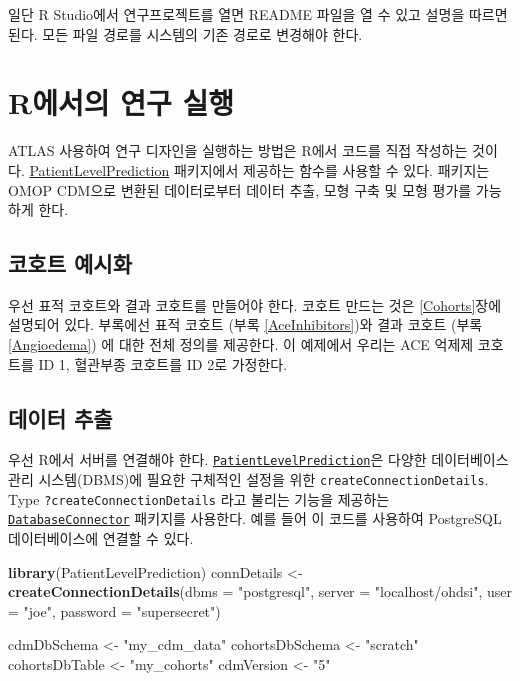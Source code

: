 \documentclass[11pt]{book}
\newenvironment{Shaded}{\begin{snugshade}}{\end{snugshade}}
\newcommand{\KeywordTok}[1]{\textcolor[rgb]{0.13,0.29,0.53}{\textbf{#1}}}
\newcommand{\DataTypeTok}[1]{\textcolor[rgb]{0.13,0.29,0.53}{#1}}
\newcommand{\StringTok}[1]{\textcolor[rgb]{0.31,0.60,0.02}{#1}}
\newcommand{\NormalTok}[1]{#1}
\theoremstyle{definition}
\theoremstyle{definition}
\theoremstyle{definition}
\theoremstyle{remark}
\begin{document}
일단 R Studio에서 연구프로젝트를 열면 README 파일을 열 수 있고 설명을
따르면 된다. 모든 파일 경로를 시스템의 기존 경로로 변경해야 한다.

\section{R에서의 연구 실행}\label{r--}

ATLAS 사용하여 연구 디자인을 실행하는 방법은 R에서 코드를 직접 작성하는
것이다.
\href{https://ohdsi.github.io/PatientLevelPrediction/}{PatientLevelPrediction}
패키지에서 제공하는 함수를 사용할 수 있다. 패키지는 OMOP CDM으로 변환된
데이터로부터 데이터 추출, 모형 구축 및 모형 평가를 가능하게 한다.

\subsection{코호트 예시화}\label{-}

우선 표적 코호트와 결과 코호트를 만들어야 한다. 코호트 만드는 것은
\ref{Cohorts}장에 설명되어 있다. 부록에선 표적 코호트 (부록
\ref{AceInhibitors})와 결과 코호트 (부록 \ref{Angioedema}) 에 대한 전체
정의를 제공한다. 이 예제에서 우리는 ACE 억제제 코호트를 ID 1, 혈관부종
코호트를 ID 2로 가정한다.

\subsection{데이터 추출}\label{--2}

우선 R에서 서버를 연결해야 한다.
\href{https://ohdsi.github.io/PatientLevelPrediction/}{\texttt{PatientLevelPrediction}}은
다양한 데이터베이스 관리 시스템(DBMS)에 필요한 구체적인 설정을 위한
\texttt{createConnectionDetails}. Type \texttt{?createConnectionDetails}
라고 불리는 기능을 제공하는
\href{https://ohdsi.github.io/DatabaseConnector/}{\texttt{DatabaseConnector}}
패키지를 사용한다. 예를 들어 이 코드를 사용하여 PostgreSQL
데이터베이스에 연결할 수 있다.

\begin{Shaded}
\begin{Highlighting}[]
\KeywordTok{library}\NormalTok{(PatientLevelPrediction)}
\NormalTok{connDetails <-}\StringTok{ }\KeywordTok{createConnectionDetails}\NormalTok{(}\DataTypeTok{dbms =} \StringTok{"postgresql"}\NormalTok{,}
                                       \DataTypeTok{server =} \StringTok{"localhost/ohdsi"}\NormalTok{,}
                                       \DataTypeTok{user =} \StringTok{"joe"}\NormalTok{,}
                                       \DataTypeTok{password =} \StringTok{"supersecret"}\NormalTok{)}

\NormalTok{cdmDbSchema <-}\StringTok{ "my_cdm_data"}
\NormalTok{cohortsDbSchema <-}\StringTok{ "scratch"}
\NormalTok{cohortsDbTable <-}\StringTok{ "my_cohorts"}
\NormalTok{cdmVersion <-}\StringTok{ "5"}
\end{Highlighting}
\end{Shaded}
\end{document}
